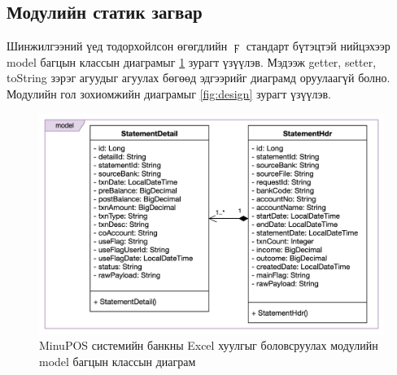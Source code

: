 \subsection{Модулийн статик загвар}
Шинжилгээний үед тодорхойлсон өгөгдлийн  $\digamma$ стандарт бүтэцтэй нийцэхээр model багцын классын диаграмыг \ref{fig:model} зурагт үзүүлэв. Мэдээж getter, setter, toString зэрэг агуудыг агуулах бөгөөд эдгээрийг диаграмд оруулаагүй болно. Модулийн гол зохиомжийн диаграмыг \ref{fig:design} зурагт үзүүлэв.

\begin{figure}[H]
		\centering
		\includegraphics[width=13cm]{images/model.png}
		\caption{MinuPOS системийн банкны Excel хуулгыг боловсруулах модулийн model багцын классын диаграм}
		\label{fig:model}
\end{figure}

